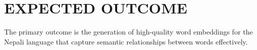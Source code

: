\chapter{EXPECTED OUTCOME}
\noindent
The primary outcome is the generation of high-quality word embeddings for the Nepali language that capture semantic relationships between words effectively.